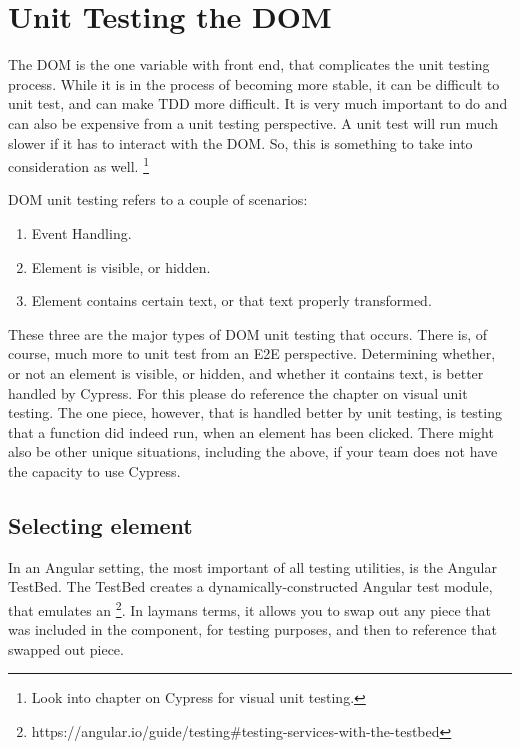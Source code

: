 \maketitle{}
\section{ Unit Testing the DOM }
The DOM is the one variable with front end, that complicates the unit testing
process. While it is in the process of becoming more stable, it can be difficult
to unit test, and can make TDD more difficult. It is very much important to do
and can also be expensive from a unit testing perspective. A unit test will
run much slower if it has to interact with the DOM. So, this is something to
take into consideration as well. \footnote{Look into chapter on Cypress for
visual unit testing.}

DOM unit testing refers to a couple of scenarios:
\begin{enumerate}
  \item Event Handling.
  \item Element is visible, or hidden.
  \item Element contains certain text, or that text properly transformed.
\end{enumerate}

These three are the major types of DOM unit testing that occurs. There is, of
course, much more to unit test from an E2E perspective. Determining whether, or
not an element is visible, or hidden, and whether it contains text, is better
handled by Cypress. For this please do reference the chapter on visual unit
testing. The one piece, however, that is handled better by unit testing, is
testing that a function did indeed run, when an element has been clicked. There
might also be other unique situations, including the above, if your team does
not have the capacity to use Cypress.

\subsection{ Selecting element }
In an Angular setting, the most important of all testing utilities, is the
Angular TestBed. The TestBed creates a dynamically-constructed Angular test
module, that emulates an \@NgModule \footnote{https://angular.io/guide/testing\#testing-services-with-the-testbed}. In laymans terms, it allows you to swap out any
piece that was included in the component, for testing purposes, and then to
reference that swapped out piece.


